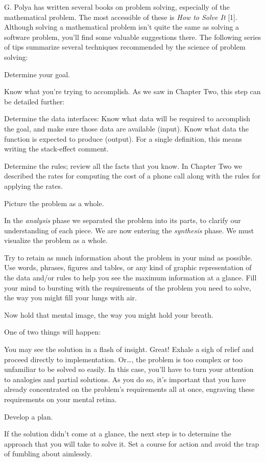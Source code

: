 G. Polya has written several books on problem solving, especially of
the mathematical problem. The most accessible of these is \emph{How to Solve
It} [1]. Although solving a mathematical problem isn't quite the same as
solving a software problem, you'll find some valuable suggestions there.
The following series of tips summarize several techniques recommended by
the science of problem solving:
\begin{tip}
Determine your goal.
\end{tip}
Know what you're trying to accomplish. As we saw in Chapter Two, this
step can be detailed further:

Determine the data interfaces: Know what data will be required to
accomplish the goal, and make sure those data are available (input).
Know what data the function is expected to produce (output). For a single
definition, this means writing the stack-effect comment.

Determine the rules; review all the facts that you know. In Chapter
Two we described the rates for computing the cost of a phone call along
with the rules for applying the rates.
\begin{tip}
Picture the problem as a whole.
\end{tip}
In the \emph{analysis} phase we separated the problem into its parts, to
clarify our understanding of each piece. We are now entering the
\emph{synthesis} phase. We must visualize the problem as a whole.

Try to retain as much information about the problem in your mind
as possible. Use words, phrases, figures and tables, or any kind of graphic
representation of the data and/or rules to help you see the maximum
information at a glance. Fill your mind to bursting with the requirements
of the problem you need to solve, the way you might fill your lungs with
air.

Now hold that mental image, the way you might hold your breath.

One of two things will happen:

You may see the solution in a flash of insight. Great! Exhale a sigh
of relief and proceed directly to implementation. Or\dots{}, the problem is
too complex or too unfamiliar to be solved so easily. In this case, you'll
have to turn your attention to analogies and partial solutions. As you do
so, it's important that you have already concentrated on the problem's
requirements all at once, engraving these requirements on your mental
retina.
\begin{tip}
Develop a plan.
\end{tip}
If the solution didn't come at a glance, the next step is to determine the
approach that you will take to solve it. Set a course for action and avoid
the trap of fumbling about aimlessly.

